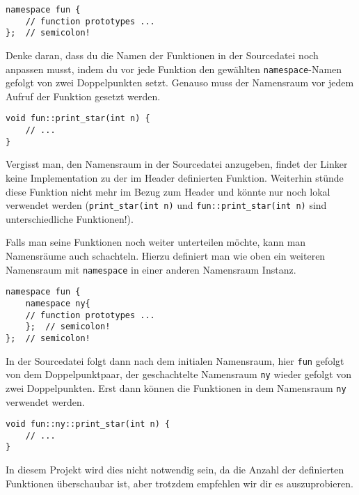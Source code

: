 \begin{lstlisting}
namespace fun {
	// function prototypes ...
};	// semicolon!
\end{lstlisting}

Denke daran, dass du die Namen der Funktionen in der Sourcedatei noch anpassen musst, indem du vor jede Funktion den gewählten \lstinline{namespace}-Namen gefolgt von zwei Doppelpunkten setzt.
Genauso muss der Namensraum vor jedem Aufruf der Funktion gesetzt werden.

\begin{lstlisting}
void fun::print_star(int n) {
	// ...
}
\end{lstlisting}

Vergisst man, den Namensraum in der Sourcedatei anzugeben, findet der Linker keine Implementation zu der im Header definierten Funktion.
Weiterhin stünde diese Funktion nicht mehr im Bezug zum Header und könnte nur noch lokal verwendet werden (\lstinline{print_star(int n)} und \lstinline{fun::print_star(int n)} sind unterschiedliche Funktionen!). \\ \smallskip

Falls man seine Funktionen noch weiter unterteilen möchte, kann man Namensräume auch schachteln.
Hierzu definiert man wie oben ein weiteren Namensraum mit \lstinline{namespace} in einer anderen Namensraum Instanz.

\begin{lstlisting}
namespace fun {
    namespace ny{
	// function prototypes ...
    };	// semicolon!
};	// semicolon!
\end{lstlisting}

In der Sourcedatei folgt dann nach dem initialen Namensraum, hier \lstinline{fun} gefolgt von dem Doppelpunktpaar, der geschachtelte Namensraum \lstinline{ny} wieder gefolgt von zwei Doppelpunkten.
Erst dann können die Funktionen in dem Namensraum \lstinline{ny} verwendet werden.

\begin{lstlisting}
void fun::ny::print_star(int n) {
	// ...
}
\end{lstlisting}

In diesem Projekt wird dies nicht notwendig sein, da die Anzahl der definierten Funktionen überschaubar ist, aber trotzdem empfehlen wir dir es auszuprobieren.

